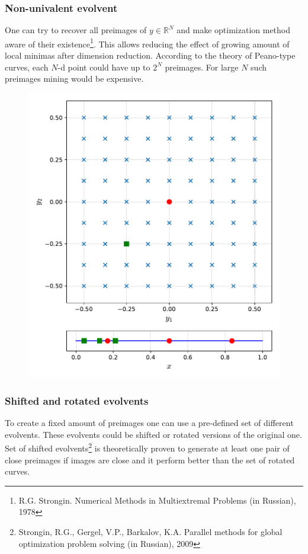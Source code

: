 \documentclass[aspectratio=1610]{beamer}
\begin{document}
\begin{frame}
  \frametitle{Non-univalent evolvent}
    One can try to recover all preimages of \(y\in\mathbb{R}^N\) and make optimization method aware of their existence\footnote{R.G. Strongin. Numerical Methods in Multiextremal Problems (in Russian), 1978}. This allows reducing the effect of growing amount of local minimas after dimension reduction.
    According to the theory of Peano-type curves, each \(N\)-d point could have up to \(2^N\) preimages. For large \(N\) such preimages mining would be expensive.
      \begin{figure}[ht]
        \includegraphics[width=.25\textwidth]{noninjective.pdf}
      \end{figure}
\end{frame}

\begin{frame}
  \frametitle{Shifted and rotated evolvents}
  To create a fixed amount of preimages one can use a pre-defined set of different evolvents. These evolvents could be shifted or rotated versions of the original one. Set of shifted evolvents\footnote{Strongin, R.G., Gergel, V.P., Barkalov, K.A. Parallel methods for global optimization problem
solving (in Russian), 2009} is theoretically proven to generate at least one pair of close preimages if images are close and it perform better than the set of rotated curves.
  \begin{figure}[ht]
  \end{figure}
\end{frame}
\end{document}
